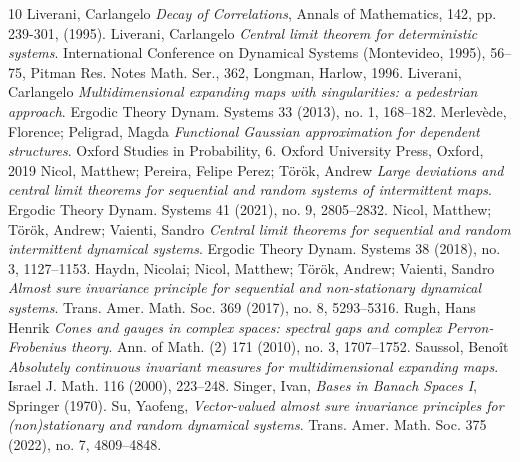 \documentclass{amsart}
\numberwithin{equation}{section}
\begin{document}
\begin{thebibliography}{10}
 Liverani, Carlangelo {\em Decay of Correlations}, Annals of Mathematics, 142, pp. 239-301, (1995).
 Liverani, Carlangelo {\em Central limit theorem for deterministic systems}. International Conference on Dynamical Systems (Montevideo, 1995), 56–75, Pitman Res. Notes Math. Ser., 362, Longman, Harlow, 1996. 
 Liverani, Carlangelo {\em Multidimensional expanding maps with singularities: a pedestrian approach}. Ergodic Theory Dynam. Systems 33 (2013), no. 1, 168–182. 
 Merlevède, Florence; Peligrad, Magda {\em
Functional Gaussian approximation for dependent structures}.
Oxford Studies in Probability, 6. Oxford University Press, Oxford, 2019
 Nicol, Matthew; Pereira, Felipe Perez; Török, Andrew {\em Large deviations and central limit theorems for sequential and random systems of intermittent maps}. Ergodic Theory Dynam. Systems 41 (2021), no. 9, 2805–2832.
  Nicol, Matthew; Török, Andrew; Vaienti, Sandro {\em Central limit theorems for sequential and random intermittent dynamical systems}. Ergodic Theory Dynam. Systems 38 (2018), no. 3, 1127--1153. 
  Haydn, Nicolai; Nicol, Matthew; Török, Andrew; Vaienti, Sandro {\em Almost sure invariance principle for sequential and non-stationary dynamical systems}. Trans. Amer. Math. Soc. 369 (2017), no. 8, 5293--5316.
 Rugh, Hans Henrik {\em Cones and gauges in complex spaces: spectral gaps and complex Perron-Frobenius theory}. Ann. of Math. (2) 171 (2010), no. 3, 1707–1752. 
 Saussol, Benoît {\em Absolutely continuous invariant measures for multidimensional expanding maps}. Israel J. Math. 116 (2000), 223–248.
 Singer, Ivan, {\em Bases in Banach Spaces I}, Springer (1970).
  Su, Yaofeng, {\em Vector-valued almost sure invariance principles for (non)stationary and random dynamical systems}. Trans. Amer. Math. Soc. 375 (2022), no. 7, 4809–4848.
\end{thebibliography}
\end{document}
